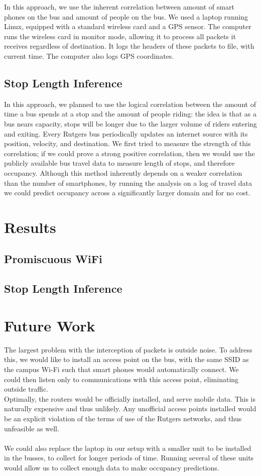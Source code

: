 \documentclass[letterpaper,english]{scrartcl}
\begin{document}
In this approach, we use the inherent correlation between amount of smart phones on the bus and amount of people on the bus.
We used a laptop running Linux, equipped with a standard wireless card and a GPS sensor.
The computer runs the wireless card in monitor mode, allowing it to process all packets it receives regardless of destination. It logs the headers of these packets to file, with current time.
The computer also logs GPS coordinates.

\subsection*{Stop Length Inference}

In this approach, we planned to use the logical correlation between the amount of time a bus spends at a stop and the amount of people riding: the idea is that as a bus nears capacity, stops will be longer due to the larger volume of riders entering and exiting.
Every Rutgers bus periodically updates an internet source with its position, velocity, and destination.
We first tried to measure the strength of this correlation; if we could prove a strong positive correlation, then we would use the publicly available bus travel data to measure length of stops, and therefore occupancy.
Although this method inherently depends on a weaker correlation than the number of smartphones, by running the analysis on a log of travel data we could predict occupancy across a significantly larger domain and for no cost.

\section*{Results}

\subsection*{Promiscuous WiFi}
\subsection*{Stop Length Inference}

\section*{Future Work}
The largest problem with the interception of packets is outside noise.
To address this, we would like to install an access point on the bus, with the same SSID as the campus Wi-Fi such that smart phones would automatically connect.
We could then listen only to communications with this access point, eliminating outside traffic.
\\
Optimally, the routers would be officially installed, and serve mobile data. This is naturally expensive and thus unlikely. Any unofficial access points installed would be an explicit violation of the terms of use of the Rutgers networks, and thus unfeasible as well.
\\
\\
We could also replace the laptop in our setup with a smaller unit to be installed in the busses, to collect for longer periods of time. Running several of these units would allow us to collect enough data to make occupancy predictions.
\end{document}
